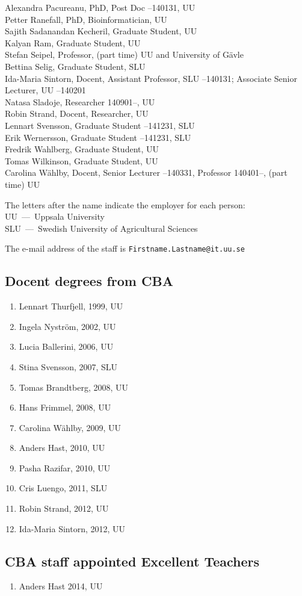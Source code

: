 Alexandra Pacureanu, PhD, Post Doc --140131, UU\\
Petter Ranefall, PhD, Bioinformatician, UU\\
Sajith Sadanandan Kecheril, Graduate Student, UU\\
Kalyan Ram, Graduate Student, UU\\
Stefan Seipel, Professor, (part time) UU and University of G\"avle \\
Bettina Selig, Graduate Student, SLU\\
Ida-Maria Sintorn, Docent, Assistant Professor, SLU --140131; Associate Senior Lecturer, UU --140201\\
Natasa Sladoje, Researcher 140901--, UU\\
Robin Strand, Docent, Researcher, UU \\
Lennart Svensson, Graduate Student --141231, SLU\\
Erik Wernersson, Graduate Student --141231, SLU\\
Fredrik Wahlberg, Graduate Student, UU\\
Tomas Wilkinson, Graduate Student, UU\\
Carolina W\"{a}hlby, Docent, Senior Lecturer --140331, Professor 140401--, (part time) UU \\
\vspace*{1mm}

\noindent

\noindent
The letters after the name indicate the employer for each person:\\
UU~---~Uppsala University\\
SLU~---~Swedish University of Agricultural Sciences


\noindent
The e-mail address of the staff is {\tt Firstname.Lastname@it.uu.se}

\newpage 

\subsection*{Docent degrees from CBA}
{\small
\begin{enumerate}
\item
Lennart Thurfjell, 1999, UU
\item
Ingela Nystr\"{o}m, 2002, UU
\item
Lucia Ballerini, 2006, UU
\item 
Stina Svensson, 2007, SLU
\item
Tomas Brandtberg, 2008, UU
\item
Hans Frimmel, 2008, UU
\item
Carolina W\"{a}hlby, 2009, UU
\item
Anders Hast, 2010, UU
\item
Pasha Razifar, 2010, UU
\item
Cris Luengo, 2011, SLU
\item
Robin Strand, 2012, UU
\item
Ida-Maria Sintorn, 2012, UU
\end{enumerate}
}
\subsection*{CBA staff appointed Excellent Teachers}
{\small
\begin{enumerate}
\item
Anders Hast 2014, UU
\end{enumerate}
}
